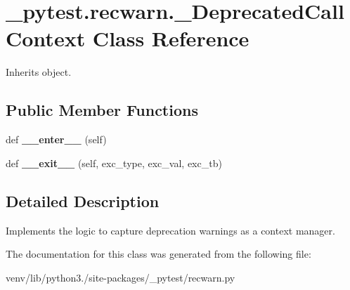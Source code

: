 \hypertarget{class__pytest_1_1recwarn_1_1___deprecated_call_context}{}\section{\+\_\+pytest.\+recwarn.\+\_\+\+Deprecated\+Call\+Context Class Reference}
\label{class__pytest_1_1recwarn_1_1___deprecated_call_context}


Inherits object.

\subsection*{Public Member Functions}
\begin{DoxyCompactItemize}
\item 
\mbox{\label{class__pytest_1_1recwarn_1_1___deprecated_call_context_ab41a64a474036aa9594e508e7eb03711}} 
def {\bfseries \+\_\+\+\_\+enter\+\_\+\+\_\+} (self)
\item 
\mbox{\label{class__pytest_1_1recwarn_1_1___deprecated_call_context_a83c8ee7a9d6715dc2c0adf8b3df1f819}} 
def {\bfseries \+\_\+\+\_\+exit\+\_\+\+\_\+} (self, exc\+\_\+type, exc\+\_\+val, exc\+\_\+tb)
\end{DoxyCompactItemize}


\subsection{Detailed Description}
\begin{DoxyVerb}Implements the logic to capture deprecation warnings as a context manager.\end{DoxyVerb}
 

The documentation for this class was generated from the following file\+:\begin{DoxyCompactItemize}
\item 
venv/lib/python3./site-\/packages/\+\_\+pytest/recwarn.\+py\end{DoxyCompactItemize}
